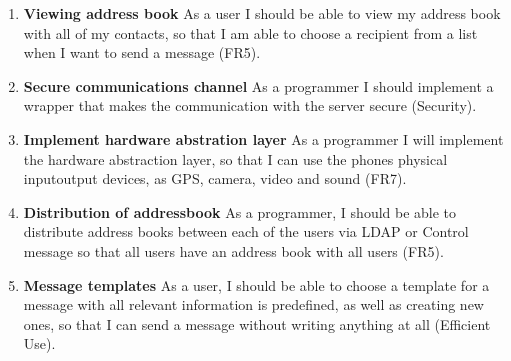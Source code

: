 \begin{enumerate}
			\item {\bf Viewing address book} As a user I should be able to view my address book with all of my contacts, so that I am able to choose a recipient from a list when I want to send a message (FR5).
			\item {\bf Secure communications channel} As a programmer I should implement a wrapper that makes the communication with the server secure (Security).
			\item {\bf Implement hardware abstration layer} As a programmer I will implement the hardware abstraction layer, so that I can use the phones physical input\/output devices, as GPS, camera, video and sound (FR7).
			\item {\bf Distribution of addressbook} As a programmer, I should be able to distribute address books between each of the users via LDAP or Control message so that all users have an address book with all users (FR5).
			\item {\bf Message templates} As a user, I should be able to choose a template for a message with all relevant information is predefined, as well as creating new ones, so that I can send a message without writing anything at all (Efficient Use).
		\end{enumerate}
